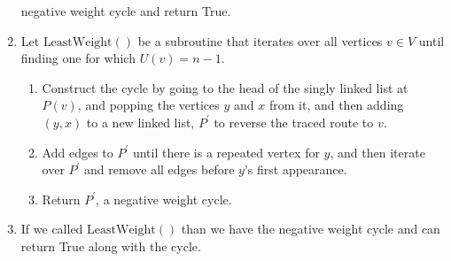 \documentclass{article}
\begin{document}
\begin{enumerate}
            negative weight cycle and return True.
      \item Let \(\text{LeastWeight}()\) be a subroutine that iterates over all vertices \(v\in V\)
            until finding one for which \(U(v) = n - 1\). \begin{enumerate}
                  \item Construct the cycle by going to the head of the singly linked list at
                        \(P(v)\), and popping the vertices \(y\) and \(x\) from it, and then adding
                        \((y,x)\) to a new linked list, \(P^{\prime}\) to reverse the traced route to \(v\).
                  \item Add edges to \(P^{\prime}\) until there is a repeated vertex for \(y\),
                        and then iterate over \(P^{\prime}\) and remove all edges before \(y\)'s first
                        appearance.
                  \item Return \(P^{\prime}\), a negative weight cycle.
            \end{enumerate}
      \item If we called \(\text{LeastWeight}()\) than we have the negative weight cycle and can
            return True along with the cycle.
\end{enumerate}
\end{document}
